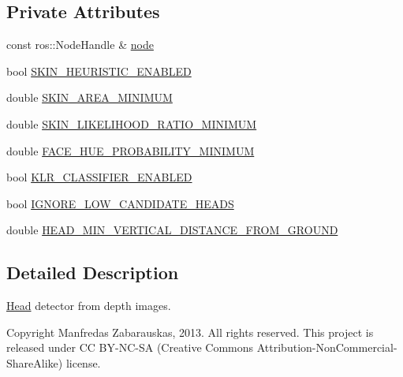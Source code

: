 \subsection*{\-Private \-Attributes}
\begin{DoxyCompactItemize}
\item 
const ros\-::\-Node\-Handle \& \hyperlink{class_r_p_depth_head_detector_a53fd04b35998c8b45ca766ea2d3235c3}{node}
\item 
bool \hyperlink{class_r_p_depth_head_detector_a5d5d149a596a53a1f71be1c7d21376af}{\-S\-K\-I\-N\-\_\-\-H\-E\-U\-R\-I\-S\-T\-I\-C\-\_\-\-E\-N\-A\-B\-L\-E\-D}
\item 
double \hyperlink{class_r_p_depth_head_detector_a19f0f94c588230091a2803f144ddc279}{\-S\-K\-I\-N\-\_\-\-A\-R\-E\-A\-\_\-\-M\-I\-N\-I\-M\-U\-M}
\item 
double \hyperlink{class_r_p_depth_head_detector_ab63e81e4e717743a28710494824e7eea}{\-S\-K\-I\-N\-\_\-\-L\-I\-K\-E\-L\-I\-H\-O\-O\-D\-\_\-\-R\-A\-T\-I\-O\-\_\-\-M\-I\-N\-I\-M\-U\-M}
\item 
double \hyperlink{class_r_p_depth_head_detector_a20dc0ad6b0d1d58e59a5a1f948929679}{\-F\-A\-C\-E\-\_\-\-H\-U\-E\-\_\-\-P\-R\-O\-B\-A\-B\-I\-L\-I\-T\-Y\-\_\-\-M\-I\-N\-I\-M\-U\-M}
\item 
bool \hyperlink{class_r_p_depth_head_detector_ad8cdcef7633eef892c4524afd6019f93}{\-K\-L\-R\-\_\-\-C\-L\-A\-S\-S\-I\-F\-I\-E\-R\-\_\-\-E\-N\-A\-B\-L\-E\-D}
\item 
bool \hyperlink{class_r_p_depth_head_detector_a915a166fa953b63240c5f3010aa999b8}{\-I\-G\-N\-O\-R\-E\-\_\-\-L\-O\-W\-\_\-\-C\-A\-N\-D\-I\-D\-A\-T\-E\-\_\-\-H\-E\-A\-D\-S}
\item 
double \hyperlink{class_r_p_depth_head_detector_a51ef553cbc6ed05f2d2c379d9e6ce503}{\-H\-E\-A\-D\-\_\-\-M\-I\-N\-\_\-\-V\-E\-R\-T\-I\-C\-A\-L\-\_\-\-D\-I\-S\-T\-A\-N\-C\-E\-\_\-\-F\-R\-O\-M\-\_\-\-G\-R\-O\-U\-N\-D}
\end{DoxyCompactItemize}


\subsection{\-Detailed \-Description}
\hyperlink{struct_head}{\-Head} detector from depth images. 

\begin{DoxyCopyright}{\-Copyright}
\-Manfredas \-Zabarauskas, 2013. \-All rights reserved. \-This project is released under \-C\-C \-B\-Y-\/\-N\-C-\/\-S\-A (\-Creative \-Commons \-Attribution-\/\-Non\-Commercial-\/\-Share\-Alike) license. 
\end{DoxyCopyright}


